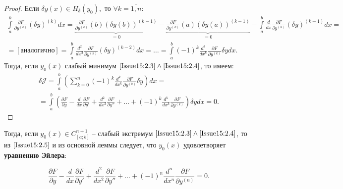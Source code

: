 \begin{proof}
	Если $\delta y(x)\in H_\delta(y_0),$ то $\forall k=\overline{1,n}:$
	\begin{multline*}
		\int\limits_a^b\frac{\partial F}{\partial y^{(k)}}(\delta y)^{(k)}dx = \underbrace{\frac{\partial F}{\partial y^{(k)}}(b)(\delta y(b))^{(k-1)}}_{=0}-\underbrace{\frac{\partial F}{\partial y^{(k)}}(a)(\delta y(a))^{(k-1)}}_{=0}-\int\limits_a^b\frac{d}{dx}\frac{\partial F}{\partial y^{(k)}}(\delta y)^{(k-1)}dx= \\ 
		=[\text{аналогично}]=\int\limits_a^b \frac{d^2}{dx^2}\frac{\partial F}{\partial y^{(k)}}(\delta y)^{(k-2)}dx=\dots=\int\limits^b_a\left(-1\right)^k\frac{d^k}{dx^k}\frac{\partial F}{\partial y^{(k)}}\delta y dx.
	\end{multline*}
	Тогда, если $y_0(x)$ слабый минимум $\eqref{Issue15:2.3}\wedge\eqref{Issue15:2.4}$, то имеем: 
	\begin{multline}
		\label{Issue15:2.5}
		\delta\mathcal{J} = \int\limits_a^b\left(\sum_{k=0}^n(-1)^k\frac{d^k}{dx^k}\frac{\partial F}{\partial y^{(k)}}\delta y\right) dx = \\
		= \int\limits_a^b\left(\frac{\partial F}{\partial y}-\frac{d}{dx}\frac{\partial F}{\partial y'}+\frac{d^2}{dx^2}\frac{\partial F}{\partial y''}+\dots+ (-1)^k\frac{d^k}{dx^k}\frac{\partial F}{\partial y^{(k)}}\right)\delta y dx=0.
	\end{multline}
\end{proof}

Тогда, если $y_0(x)\in C^{n+1}_{[a;b]}$ -- слабый экстремум $\eqref{Issue15:2.3}\wedge\eqref{Issue15:2.4}$, то из $\eqref{Issue15:2.5}$ и из основной леммы следует, что $y_0(x)$ удовлетворяет \textbf{уравнению Эйлера}:

\begin{equation}
	\label{Issue15:2.6}
	\frac{\partial F}{\partial y} - \frac{d}{dx}\frac{\partial F}{\partial y'}+\frac{d^2}{dx^2}\frac{\partial F}{\partial y''}+\dots+(-1)^n\frac{d^n}{dx^n}\frac{\partial F}{\partial y^{(n)}}=0.
\end{equation}


